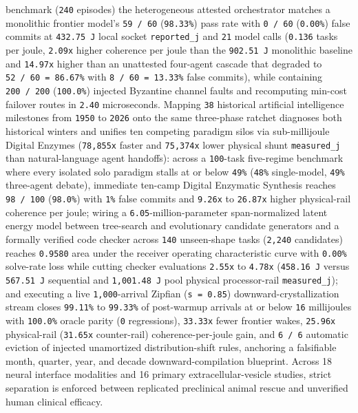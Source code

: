\documentclass[10pt,letterpaper]{article}
\begin{document}
benchmark (\texttt{240} episodes) the heterogeneous attested
orchestrator matches a monolithic frontier model's \texttt{59\ /\ 60}
(\texttt{98.33\%}) pass rate with \texttt{0\ /\ 60} (\texttt{0.00\%})
false commits at \texttt{432.75\ J} local socket \texttt{reported\_\allowbreak{}j}
and \texttt{21} model calls (\texttt{0.136} tasks per joule,
\texttt{2.09x} higher coherence per joule than the \texttt{902.51\ J}
monolithic baseline and \texttt{14.97x} higher than an unattested
four-agent cascade that degraded to \texttt{52\ /\allowbreak{}\ 60\ =\ 86.\allowbreak{}67\%} with
\texttt{8\ /\allowbreak{}\ 60\ =\ 13.\allowbreak{}33\%} false commits), while containing
\texttt{200\ /\allowbreak{}\ 200} (\texttt{100.0\%}) injected Byzantine channel
faults and recomputing min-cost failover routes in \texttt{2.40}
microseconds. Mapping \texttt{38} historical artificial intelligence
milestones from \texttt{1950} to \texttt{2026} onto the same three-phase
ratchet diagnoses both historical winters and unifies ten competing
paradigm silos via sub-millijoule Digital Enzymes (\texttt{78,855x}
faster and \texttt{75,374x} lower physical shunt \texttt{measured\_\allowbreak{}j}
than natural-language agent handoffs): across a \texttt{100}-task
five-regime benchmark where every isolated solo paradigm stalls at or
below \texttt{49\%} (\texttt{48\%} single-model, \texttt{49\%}
three-agent debate), immediate ten-camp Digital Enzymatic Synthesis
reaches \texttt{98\ /\allowbreak{}\ 100} (\texttt{98.0\%}) with \texttt{1\%} false
commits and \texttt{9.26x} to \texttt{26.87x} higher physical-rail
coherence per joule; wiring a \texttt{6.05}-million-parameter
span-normalized latent energy model between tree-search and evolutionary
candidate generators and a formally verified code checker across
\texttt{140} unseen-shape tasks (\texttt{2,240} candidates) reaches
\texttt{0.9580} area under the receiver operating characteristic curve
with \texttt{0.00\%} solve-rate loss while cutting checker evaluations
\texttt{2.55x} to \texttt{4.78x} (\texttt{458.16\ J} versus
\texttt{567.51\ J} sequential and \texttt{1,001.48\ J} pool physical
processor-rail \texttt{measured\_\allowbreak{}j}); and executing a live
\texttt{1,000}-arrival Zipfian (\texttt{s\ =\ 0.85})
downward-crystallization stream closes \texttt{99.11\%} to
\texttt{99.33\%} of post-warmup arrivals at or below \texttt{16}
millijoules with \texttt{100.0\%} oracle parity (\texttt{0}
regressions), \texttt{33.33x} fewer frontier wakes, \texttt{25.96x}
physical-rail (\texttt{31.65x} counter-rail) coherence-per-joule gain,
and \texttt{6\ /\ 6} automatic eviction of injected unamortized
distribution-shift rules, anchoring a falsifiable month, quarter, year,
and decade downward-compilation blueprint. Across 18 neural interface
modalities and 16 primary extracellular-vesicle studies, strict
separation is enforced between replicated preclinical animal rescue and
unverified human clinical efficacy.
\end{document}
